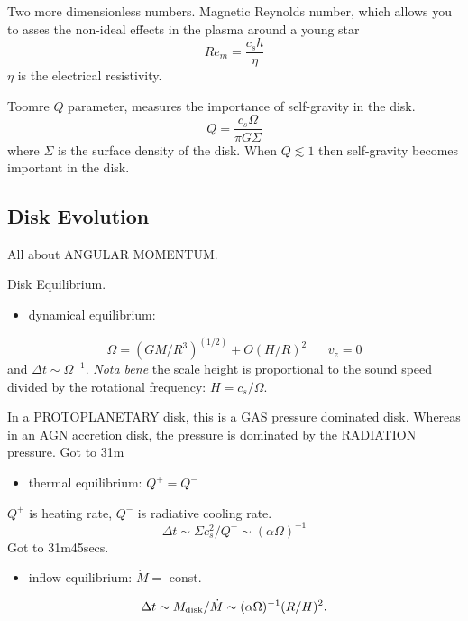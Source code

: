 \documentclass[11pt,a4paper]{article}
\begin{document}
Two more dimensionless numbers.  Magnetic Reynolds number, which
allows you to asses the non-ideal effects in the plasma around a
young star 
\begin{equation} Re_{m} = \frac{ c_{s} h} {\eta}
\end{equation} $\eta$ is the electrical resistivity.

Toomre $Q$ parameter, measures the importance of self-gravity in the
disk.
\begin{equation} Q = \frac{ c_{s} \Omega } {\pi G \Sigma}
\end{equation} where $\Sigma$ is the surface density of the disk.
When $Q\lesssim1$ then self-gravity becomes important in the disk.


\subsection{Disk Evolution}
All about ANGULAR MOMENTUM. 

Disk Equilibrium. 
\begin{itemize}
\item dynamical equilibrium: 
\end{itemize}
\begin{equation}
\Omega = (GM / R^3)^(1/2)  + O(H/R)^{2}          \;\;\;\;\;\; v_{z} = 0
\end{equation}
and $\Delta t \sim \Omega^{-1}$. 
{\it Nota bene} the scale height is proportional to the sound speed divided 
by the rotational frequency: $H = c_{s} / \Omega$. 

In a PROTOPLANETARY disk, this is a GAS pressure dominated disk. 
Whereas in an AGN accretion disk, the pressure is dominated by the
RADIATION pressure. 
Got to 31m

\begin{itemize}
\item thermal equilibrium:   $Q^{+}=Q^{-}$
\end{itemize}
 $Q^{+}$ is heating rate,  $Q^{-}$ is radiative cooling rate. 
\begin{equation}
\Delta t \sim \Sigma c_{s}^{2} / Q^{+} \sim (\alpha \Omega)^{-1}
\end{equation}
Got to 31m45secs. 

\begin{itemize}
\item inflow equilibrium:   $\dot{M} =$ const. 
\end{itemize}
\begin{equation}
\Delta t \sim M_{\rm disk}/\dot{M}   \sim  (\alpha \Omega)^{-1} (R/H)^2. 
\end{equation}





\end{document}
